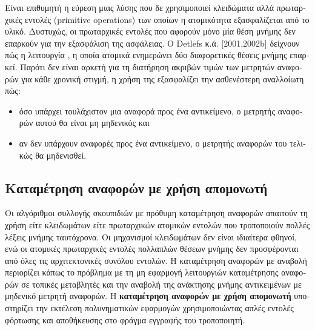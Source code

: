 \begin{greek}
Είναι επιθυμητή η εύρεση μιας λύσης που δε χρησιμοποιεί κλειδώματα αλλά πρωταρχικές εντολές
(primitive operations) των οποίων η ατομικότητα εξασφαλίζεται από το υλικό. Δυστυχώς, οι πρωταρχικές 
εντολές που αφορούν μόνο μία θέση μνήμης δεν επαρκούν για την εξασφάλιση της ασφάλειας.
Ο Detlefs κ.ά. \cite{DBLP:conf/podc/DetlefsMMS01} [2001,2002b] δείχνουν πώς η λειτουργία , η οποία
ατομικά ενημερώνει δύο διαφορετικές θέσεις μνήμης επαρκεί. Παρότι δεν είναι αρκετή για τη διατήρηση
ακριβών τιμών των μετρητών αναφορών για κάθε χρονική στιγμή, η χρήση της εξασφαλίζει την ασθενέστερη
αναλλοίωτη πώς:
\begin{itemize}
\item όσο υπάρχει τουλάχιστον μια αναφορά προς ένα αντικείμενο, ο μετρητής αναφορών αυτού θα είναι
μη μηδενικός και
\item αν δεν υπάρχουν αναφορές προς ένα αντικείμενο, ο μετρητής αναφορών του τελικώς θα μηδενισθεί.
\end{itemize}

\subsection{Καταμέτρηση αναφορών με χρήση απομονωτή}
Οι αλγόριθμοι συλλογής σκουπιδιών με πρόθυμη καταμέτρηση
αναφορών απαιτούν τη χρήση είτε κλειδωμάτων είτε πρωταρχικών
ατομικών εντολών που τροποποιούν πολλές λέξεις μνήμης
ταυτόχρονα. Οι μηχανισμοί κλειδωμάτων δεν είναι ιδιαίτερα
φθηνοί, ενώ οι ατομικές πρωταρχικές εντολές πολλαπλών θέσεων
μνήμης δεν προσφέρονται από όλες τις αρχιτεκτονικές συνόλου
εντολών. Η καταμέτρηση αναφορών με αναβολή περιορίζει κάπως
το πρόβλημα με τη μη εφαρμογή λειτουργιών καταμέτρησης αναφορών
σε τοπικές μεταβλητές και την αναβολή της ανάκτησης μνήμης
αντικειμένων με μηδενικό μετρητή αναφορών. H
\textbf{καταμέτρηση αναφορών με χρήση απομονωτή} υποστηρίζει
την εκτέλεση πολυνηματικών εφαρμογών χρησιμοποιώντας απλές
εντολές φόρτωσης και αποθήκευσης στο φράγμα εγγραφής του
τροποποιητή.


\end{greek}
